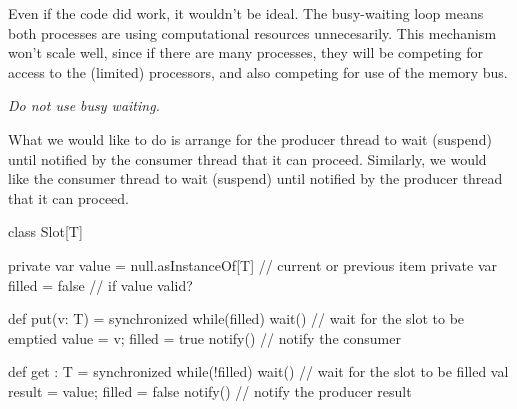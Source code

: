 
\begin{slide}

Even if the code did work, it wouldn't be ideal.
%
The busy-waiting loop means both processes are using computational resources
unnecesarily.  This mechanism won't scale well, since if there are many
processes, they will be competing for access to the (limited) processors, and
also competing for use of the memory bus.

\emph{Do not use busy waiting.}




What we would like to do is arrange for the producer thread to wait (suspend)
until notified by the consumer thread that it can proceed.  Similarly, we
would like the consumer thread to wait (suspend) until notified by the
producer thread that it can proceed.
\end{slide}


\begin{slide}

\begin{scala}
class Slot[T]{
  private var value = null.asInstanceOf[T] // current or previous item
  private var filled = false                 // if value valid?

  def put(v: T) = synchronized{
    while(filled) wait() // wait for the slot to be emptied
    value = v; filled = true
    notify()  // notify the consumer
  }

  def get : T = synchronized{
    while(!filled) wait() // wait for the slot to be filled
    val result = value; filled = false
    notify()  // notify the producer
    result
  }
}
\end{scala}
\end{slide}

